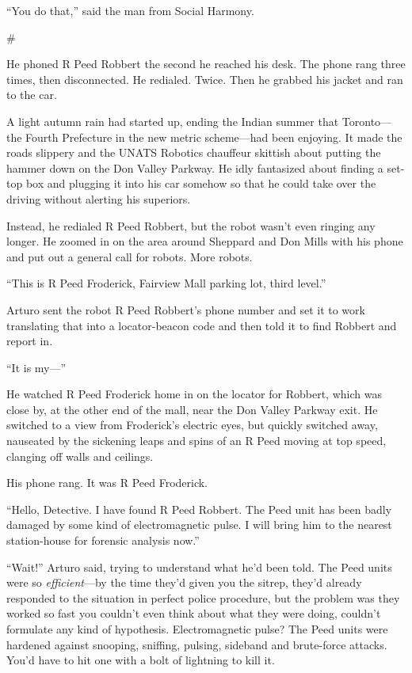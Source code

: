 “You do that,” said the man from Social Harmony.

\#

He phoned R Peed Robbert the second he reached his desk. The phone
rang three times, then disconnected. He redialed. Twice. Then he
grabbed his jacket and ran to the car.

A light autumn rain had started up, ending the Indian summer that
Toronto—the Fourth Prefecture in the new metric scheme—had been
enjoying. It made the roads slippery and the UNATS Robotics
chauffeur skittish about putting the hammer down on the Don Valley
Parkway. He idly fantasized about finding a set-top box and
plugging it into his car somehow so that he could take over the
driving without alerting his superiors.

Instead, he redialed R Peed Robbert, but the robot wasn’t even
ringing any longer. He zoomed in on the area around Sheppard and
Don Mills with his phone and put out a general call for robots.
More robots.

“This is R Peed Froderick, Fairview Mall parking lot, third
level.”

Arturo sent the robot R Peed Robbert’s phone number and set it to
work translating that into a locator-beacon code and then told it
to find Robbert and report in.

“It is my—”

He watched R Peed Froderick home in on the locator for Robbert,
which was close by, at the other end of the mall, near the Don
Valley Parkway exit. He switched to a view from Froderick’s
electric eyes, but quickly switched away, nauseated by the
sickening leaps and spins of an R Peed moving at top speed,
clanging off walls and ceilings.

His phone rang. It was R Peed Froderick.

“Hello, Detective. I have found R Peed Robbert. The Peed unit has
been badly damaged by some kind of electromagnetic pulse. I will
bring him to the nearest station-house for forensic analysis now.”

“Wait!” Arturo said, trying to understand what he’d been told. The
Peed units were so \emph{efficient}—by the time they’d given you
the sitrep, they’d already responded to the situation in perfect
police procedure, but the problem was they worked so fast you
couldn’t even think about what they were doing, couldn’t formulate
any kind of hypothesis. Electromagnetic pulse? The Peed units were
hardened against snooping, sniffing, pulsing, sideband and
brute-force attacks. You’d have to hit one with a bolt of lightning
to kill it.

